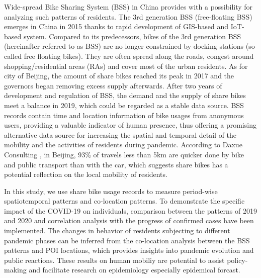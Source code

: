 \documentclass[preprints,article,accept,moreauthors,pdftex]{Definitions/mdpi}
\begin{document}
Wide-spread Bike Sharing System (BSS) in China provides with a possibility for analyzing such patterns of residents.
The 3rd generation BSS (free-floating BSS) emerges in China in 2015 thanks to rapid development of GIS-based and IoT-based system. 
Compared to its predecessors, bikes of the 3rd generation BSS (hereinafter referred to as BSS) are no longer constrained by docking stations (so-called free floating bikes).
They are often spread along the roads, congest around shopping/residential areas (RAs) and cover most of the urban residents. 
As for city of Beijing, the amount of share bikes reached its peak in 2017 and the governors began removing excess supply afterwards. 
After two years of development and regulation of BSS, the demand and the supply of share bikes meet a balance in 2019, which could be regarded as a stable data source.
BSS records contain time and location information of bike usages from anonymous users, providing a valuable indicator of human presence, thus offering a promising alternative data source for increasing the spatial and temporal detail of the mobility and the activities of residents during pandemic.
According to Daxue Consulting \cite{bssmodel}, in Beijing, 93\% of travels less than 5km are quicker done by bike and public transport than with the car, which suggests share bikes has a potential reflection on the local mobility of residents.

In this study, we use share bike usage records to measure period-wise spatiotemporal patterns and co-location patterns. 
To demonstrate the specific impact of the COVID-19 on individuals, comparison between the patterns of 2019 and 2020 and correlation analysis with the progress of confirmed cases have been implemented.
The changes in behavior of residents subjecting to different pandemic phases can be inferred from the co-location analysis between the BSS patterns and POI locations, which provides insights into pandemic evolution and public reactions.
These results on human mobiliy are potential to assist policy-making and facilitate research on epidemiology especially epidemical forcast.
\end{document}
